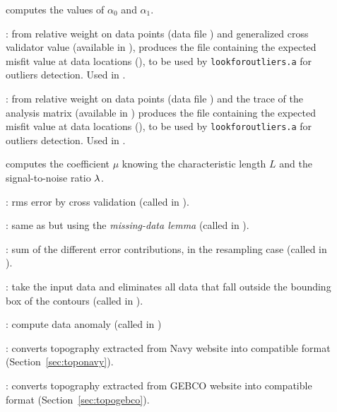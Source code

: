 \begin{description}
\item[] computes the values of $\alpha_{0}$ and $\alpha_1$.

\item[]: from relative weight on data points (data file ) and generalized cross validator value (available in ), produces the file containing the expected misfit value at data locations (), to be used by \texttt{look\-for\-outliers.a} for outliers detection. Used in .

\item[]: from relative weight on data points (data file ) and the trace 
of the analysis matrix (available in ) produces the file
containing the expected misfit value at data locations (), to be 
used by \texttt{look\-for\-outliers.a} for outliers detection. Used in .

\item[] computes the coefficient $\mu$ knowing  the characteristic length $L$ and the signal-to-noise ratio $\lambda$.

\item[]: rms error by cross validation (called in ).

\item[]: same as  but using the \textit{missing-data lemma} (called in ).

\item[]: sum of the different error contributions, in the resampling case (called in ).


\item[]: take the input data  and eliminates 
all data that fall outside the bounding box of the contours (called in ). 

\item[]: compute data anomaly (called in )


\item[]: converts topography extracted from Navy website into \diva compatible format (Section~\ref{sec:toponavy}).

\item[]: converts topography extracted from GEBCO website into \diva compatible format (Section~\ref{sec:topogebco}).



\end{description}
